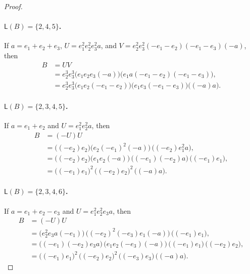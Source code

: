 \documentclass[a4paper, 10pt]{amsart}
\theoremstyle{plain}
\theoremstyle{definition}
\theoremstyle{definition}
\numberwithin{equation}{section}
\begin{document}
\begin{proof}
	\paragraph*{$\mathsf L(B)=\{2,4,5\}$.}
	If $a=e_1+e_2+e_3$,  $U=e_1^2e_2^2e_3^2a$, and  $V=e_2^2e_3^2(-e_1-e_2)(-e_1-e_3)(-a)$, then
	\begin{align*}
	B & = UV \\
	&=e_2^3  e_3^3
	 \bigl(e_1e_2e_3(-a)\bigr)
	 \bigl(e_1a(-e_1-e_2)(-e_1-e_3)\bigr),\\
	&=e_2^3  e_3^3
	 \bigl(e_1e_2(-e_1-e_2)\bigr)
	 \bigl(e_1e_3(-e_1-e_3)\bigr)  \big( (-a)a \big).
	\end{align*}

	\paragraph*{$\mathsf L(B)=\{2,3,4,5\}$.}
	If $a=e_1+e_2$ and  $U=e_1^2e_2^2a$, then
	\begin{align*}
	B & = (-U)U \\
	& = \big( (-e_2)e_2 \big)  \bigl(e_2(-e_1)^2(-a)\bigr)
	\, \bigl((-e_2)e_1^2a\bigr),\\
	&= \big( (-e_2){e_2}\big) \bigl(e_1e_2(-a)\bigr)
	\, \bigl((-e_1)(-e_2)a\bigr)\,  \big( (-e_1){e_1} \big),\\
	&= \big( (-e_1){e_1}\big)^2\, \big( (-e_2){e_2}\big)^2\, \big( (-a){a} \big).
	\end{align*}

	\paragraph*{$\mathsf L(B)=\{2,3,4,6\}$.}
	If $a=e_1+e_2-e_3$ and  $U=e_1^2e_2^2e_3a$, then
	\begin{align*}
	B & = (-U)U \\
	&=\bigl(e_2^2e_3a(-e_1)\bigr)
	\, \bigl((-e_2)^2(-e_3)e_1(-a)\bigr) \, \big( (-e_1){e_1} \big),\\
	&=\bigl((-e_1)(-e_2)e_3a\bigr)
	\,\bigl(e_1e_2(-e_3)(-a)\bigr)\, \big( (-e_1){e_1} \big) \, \big( (-e_2){e_2} \big),\\
	&= \big( (-e_1){e_1}\big)^2\, \big( (-e_2){e_2}\big)^2\, \big( (-e_3){e_3}\big)\, \big( (-a){a}\big).
	\end{align*}


\end{proof}
\end{document}
